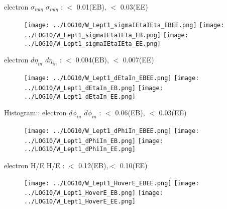 \documentclass[xcolor=x11names,compress]{beamer}
\renewcommand{\(}{\begin{columns}}
\renewcommand{\)}{\end{columns}}
\newcommand{\<}[1]{\begin{column}{#1}}
\renewcommand{\>}{\end{column}}
\begin{document}
\begin{frame}{electron $\sigma_{i\eta i\eta}$}
  $\sigma_{i\eta i\eta}$ : $<$ 0.01(EB), $<$ 0.03(EE)
  \begin{figure}[ht!]
    \centering
    \scalebox{0.13}
    {
      \texttt{[image: ../LOG10/W\_Lept1\_sigmaIEtaIEta\_EBEE.png]}
      \texttt{[image: ../LOG10/W\_Lept1\_sigmaIEtaIEta\_EB.png]}
      \texttt{[image: ../LOG10/W\_Lept1\_sigmaIEtaIEta\_EE.png]}
    }
  \end{figure}

\end{frame}


\begin{frame}{electron $d\eta_{in}$}
$d\eta_{in}$ : $<$ 0.004(EB), $<$ 0.007(EE)
  \begin{figure}[ht!]
    \centering
    \scalebox{0.13}
    {
      \texttt{[image: ../LOG10/W\_Lept1\_dEtaIn\_EBEE.png]}
      \texttt{[image: ../LOG10/W\_Lept1\_dEtaIn\_EB.png]}
      \texttt{[image: ../LOG10/W\_Lept1\_dEtaIn\_EE.png]}
    }
  \end{figure}

\end{frame}

\begin{frame}{Histogram:: electron $d\phi_{in}$}
$d\phi_{in}$ : $<$ 0.06(EB), $<$ 0.03(EE)
  \begin{figure}[ht!]
    \centering
    \scalebox{0.13}
    {
      \texttt{[image: ../LOG10/W\_Lept1\_dPhiIn\_EBEE.png]}
      \texttt{[image: ../LOG10/W\_Lept1\_dPhiIn\_EB.png]}
      \texttt{[image: ../LOG10/W\_Lept1\_dPhiIn\_EE.png]}
    }
  \end{figure}

\end{frame}


\begin{frame}{electron H/E}
H/E : $<$ 0.12(EB),$<$ 0.10(EE)
  \begin{figure}[ht!]
    \centering
    \scalebox{0.13}
    {
      \texttt{[image: ../LOG10/W\_Lept1\_HoverE\_EBEE.png]}
      \texttt{[image: ../LOG10/W\_Lept1\_HoverE\_EB.png]}
      \texttt{[image: ../LOG10/W\_Lept1\_HoverE\_EE.png]}
    }
  \end{figure}

\end{frame}
\end{document}
